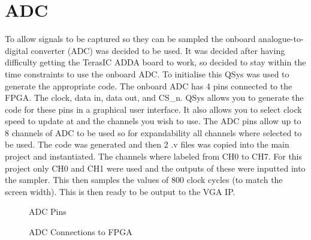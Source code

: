 \documentclass[a4paper,12pt]{article}
\begin{document}
\section{ADC}
\begin{flushleft}
To allow signals to be captured so they can be sampled the onboard analogue-to-digital converter (ADC) was decided to be used. It was decided after having difficulty getting the TerasIC ADDA board to work, so decided to stay within the time constraints to use the onboard ADC. To initialise this QSys was used to generate the appropriate code. The onboard ADC has 4 pins connected to the FPGA. The clock, data in, data out, and CS\_n. QSys allows you to generate the code for these pins in a graphical user interface. It also allows you to select clock speed to update at and the channels you wish to use. The ADC pins allow up to 8 channels of ADC to be used so for expandability all channels where selected to be used. The code was generated and then 2 .v files was copied into the main project and instantiated. The channels where labeled from CH0 to CH7. For this project only CH0 and CH1 were used and the outputs of these were inputted into the sampler. This then samples the values of 800 clock cycles (to match the screen width). This is then ready to be output to the VGA IP.
\begin{figure}[H]
	\centering
	\caption{ADC Pins \cite{terasic_2014}}
\end{figure}

\begin{figure}[H]
	\centering
	\caption{ADC Connections to FPGA \cite{terasic_2014}}
\end{figure}
\end{flushleft}
\newpage
\end{document}
